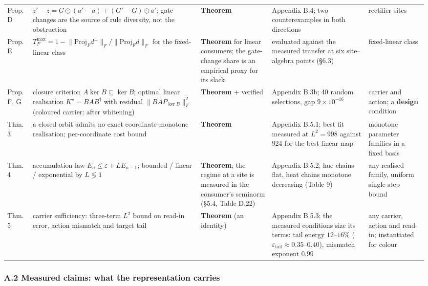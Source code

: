 \begin{table}[t]
\begin{tabularx}{\textwidth}{@{}>{\raggedright\arraybackslash}X >{\raggedright\arraybackslash}X >{\raggedright\arraybackslash}X >{\raggedright\arraybackslash}X >{\raggedright\arraybackslash}X@{}}
Prop. D & $z'-z=G\odot(a'-a)+(G'-G)\odot a'$; gate changes are the source of rule diversity, not the obstruction & \textbf{Theorem} & Appendix B.4; two counterexamples in both directions & rectifier sites \\
Prop. E & $T_F^{\max}=1-\lVert\mathrm{Proj}_F d^\perp\rVert_F/\lVert\mathrm{Proj}_F d\rVert_F$ for the fixed-linear class & \textbf{Theorem} for linear consumers; the gate-change share is an empirical proxy for its slack & evaluated against the measured transfer at six site--algebra points (\S{}6.3) & fixed-linear class \\
Prop. F, G & closure criterion $A\ker B\subseteq\ker B$; optimal linear realisation $K^\star=BAB^\dagger$ with residual $\|BAP_{\ker B}\|_F^2$ (coloured carrier: after whitening) & \textbf{Theorem} + verified & Appendix B.3b; 40 random selections, gap $9\times10^{-16}$ & carrier and action; a \textbf{design} condition \\
Thm. 3 & a closed orbit admits no exact coordinate-monotone realisation; per-coordinate cost bound & \textbf{Theorem} & Appendix B.5.1; best fit measured at $L^2=998$ against $924$ for the best linear map & monotone parameter families in a fixed basis \\
Thm. 4 & accumulation law $E_n\le\varepsilon+LE_{n-1}$; bounded / linear / exponential by $L\lessgtr1$ & \textbf{Theorem}; the regime at a site is measured in the consumer's seminorm (\S{}5.4, Table D.22) & Appendix B.5.2; hue chains flat, heat chains monotone decreasing (Table 9) & any realised family, uniform single-step bound \\
Thm. 5 & carrier sufficiency: three-term $L^2$ bound on read-in error, action mismatch and target tail & \textbf{Theorem} (an identity) & Appendix B.5.3; the measured conditions size its terms: tail energy $12$--$16\%$ ($\varepsilon_{\mathrm{tail}}\approx0.35$--$0.40$), mismatch exponent $0.99$ & any carrier, action and read-in; instantiated for colour \\
\bottomrule
\end{tabularx}
\end{table}

\subsubsection*{A.2 Measured claims: what the representation carries}


